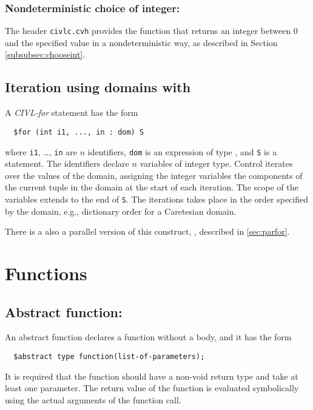 \subsubsection{Nondeterministic choice of integer:
  \texorpdfstring{\cchooseint}{\$choose\_int}}
The header \texttt{civlc.cvh} provides the function \cchooseint{} that returns an integer between 0 and the specified value
in a nondeterministic way, as described in Section \ref{subsubsec:chooseint}.

\subsection{Iteration using domains with \cfor}
\label{sec:cfor}

A \emph{CIVL-for} statement has the form
\begin{verbatim}
  $for (int i1, ..., in : dom) S
\end{verbatim}
where \texttt{i1}, \ldots, \texttt{in} are $n$ identifiers,
\texttt{dom} is an expression of type , and
\texttt{S} is a statement.  The identifiers declare $n$ variables of
integer type.  Control iterates over the values of the domain,
assigning the integer variables the components of the current tuple in
the domain at the start of each iteration.  The scope of the variables
extends to the end of \texttt{S}.  The iterations takes place in the
order specified by the domain, e.g., dictionary order for a Caretesian
domain.

There is a also a parallel version of this construct, \cparfor,
described in \ref{sec:parfor}.

\section{Functions}
\subsection{Abstract function: \cabstract}

An abstract function declares a function without a body, and it has the form 

\begin{verbatim}
  $abstract type function(list-of-parameters);
\end{verbatim}

It is required that the function should have a non-void return type and take at least one parameter.
The return value of the function is evaluated symbolically using the actual arguments of the function call.

